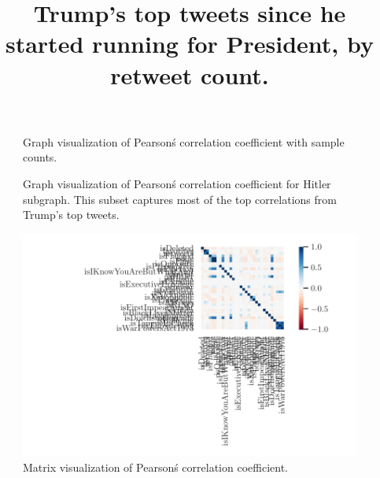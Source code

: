 \documentclass{article}
\begin{document}
    \title{Trump's top tweets since he started running for President, by retweet count.}
    \begin{figure}
         \hspace{-1cm}
         
         \caption{Graph visualization of Pearson\'s correlation coefficient with sample counts.}
    \end{figure}
           
    \hspace{-4cm}
    \vspace{-20cm}
    \begin{figure}
        \hspace{-.8cm}
        
        \caption{Graph visualization of Pearson\'s correlation coefficient for Hitler subgraph. This subset captures most of the top correlations from Trump's top tweets.}
    \end{figure}
    
    \begin{figure}
         \vspace{-1cm}
         \hspace{-3.05cm}
         \includegraphics{corr_heatmap.pdf}
         \caption{Matrix visualization of Pearson\'s correlation coefficient.}
    \end{figure}
    
\end{document}
